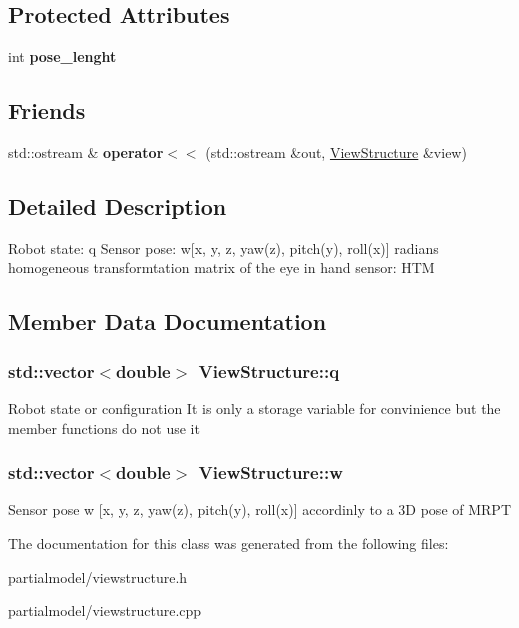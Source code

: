 \subsection*{Protected Attributes}
\begin{DoxyCompactItemize}
\item 
int {\bfseries pose\+\_\+lenght}\hypertarget{classViewStructure_a0ff5ef759282ae96eda005a57967de6d}{}\label{classViewStructure_a0ff5ef759282ae96eda005a57967de6d}

\end{DoxyCompactItemize}
\subsection*{Friends}
\begin{DoxyCompactItemize}
\item 
std\+::ostream \& {\bfseries operator$<$$<$} (std\+::ostream \&out, \hyperlink{classViewStructure}{View\+Structure} \&view)\hypertarget{classViewStructure_a6cd2f51a9d96a96ad35fc6e61514d249}{}\label{classViewStructure_a6cd2f51a9d96a96ad35fc6e61514d249}

\end{DoxyCompactItemize}


\subsection{Detailed Description}
Robot state\+: q Sensor pose\+: w\mbox{[}x, y, z, yaw(z), pitch(y), roll(x)\mbox{]} radians homogeneous transformtation matrix of the eye in hand sensor\+: H\+TM 

\subsection{Member Data Documentation}
\subsubsection[{\texorpdfstring{q}{q}}]{\setlength{\rightskip}{0pt plus 5cm}std\+::vector$<$double$>$ View\+Structure\+::q}\hypertarget{classViewStructure_a5c78495a797c42e810e808df7a5da7cb}{}\label{classViewStructure_a5c78495a797c42e810e808df7a5da7cb}
Robot state or configuration It is only a storage variable for convinience but the member functions do not use it 
\subsubsection[{\texorpdfstring{w}{w}}]{\setlength{\rightskip}{0pt plus 5cm}std\+::vector$<$double$>$ View\+Structure\+::w}\hypertarget{classViewStructure_a378f7e104ffc8fddd6f9033399900ef6}{}\label{classViewStructure_a378f7e104ffc8fddd6f9033399900ef6}
Sensor pose w \mbox{[}x, y, z, yaw(z), pitch(y), roll(x)\mbox{]} accordinly to a 3D pose of M\+R\+PT 

The documentation for this class was generated from the following files\+:\begin{DoxyCompactItemize}
\item 
partialmodel/viewstructure.\+h\item 
partialmodel/viewstructure.\+cpp\end{DoxyCompactItemize}
